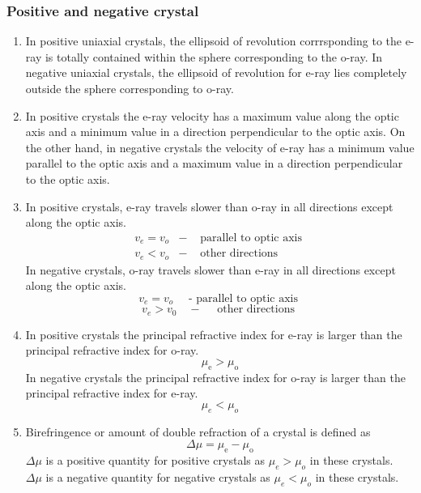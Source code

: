 \subsubsection{Positive and negative crystal}
\begin{enumerate}
	\item In positive uniaxial crystals, the ellipsoid of revolution corrrsponding to the e-ray is totally contained within the sphere corresponding to the o-ray.
	In negative uniaxial crystals, the ellipsoid of revolution for e-ray lies completely outside the sphere corresponding to o-ray.
	\item In positive crystals the e-ray velocity has a maximum value along the optic axis and a minimum value in a direction perpendicular to the optic axis.
	On the other hand, in negative crystals the velocity of e-ray has a minimum value parallel to the optic axis and a maximum value in a direction perpendicular to the optic axis.
	\item In positive crystals, e-ray travels slower than o-ray in all directions except along the optic axis.
	$$
	\begin{array}{lll}
	v_{e}=v_{o} & - & \text { parallel to optic axis } \\
	v_{e}<v_{o} & - & \text { other directions }
	\end{array}
	$$
In negative crystals, o-ray travels slower than e-ray in all directions except along the optic axis.
$$v_{e}=v_{o} \quad \text { - parallel to optic axis }$$
$$v_{e}>v_{0} \quad-\quad \text { other directions }$$
\item In positive crystals the principal refractive index for e-ray is larger than the principal refractive index for o-ray.
$$\mu_{\mathrm{e}}>\mu_{\mathrm{o}}$$
In negative crystals the principal refractive index for o-ray is larger than the principal refractive index for e-ray.
$$\mu_{e}<\mu_{o}$$
\item Birefringence or amount of double refraction of a crystal is defined as
$$
\Delta \mu=\mu_{\mathrm{e}}-\mu_{\mathrm{o}}
$$
$\Delta \mu$ is a positive quantity for positive crystals as $\mu_{e}>\mu_{o}$ in these crystals.\\
 $\Delta \mu$ is a negative quantity for negative crystals as $\mu_{e}<\mu_{o}$ in these crystals.
\end{enumerate}

